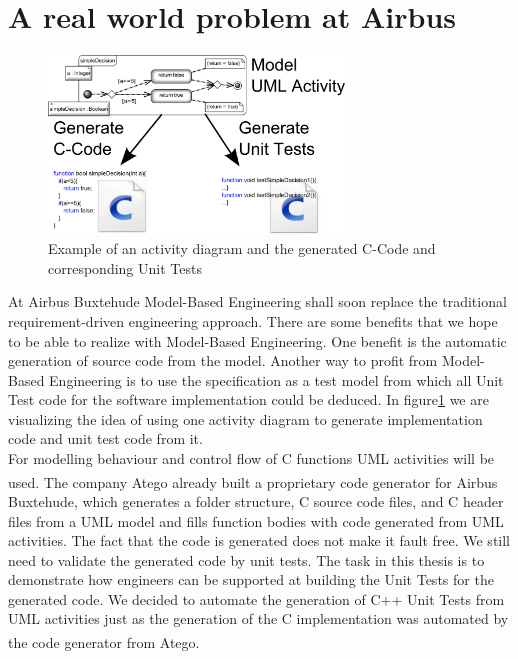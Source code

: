 \section{A real world problem at Airbus}
\begin{figure}
\label{fig:Act2Code+Tests}
\includegraphics[width=0.7\textwidth]{./pics/Activity2Code+Tests.png}
\caption{Example of an activity diagram and the generated C-Code and corresponding Unit Tests}
\end{figure}
At Airbus Buxtehude Model-Based Engineering shall soon replace the traditional requirement-driven engineering approach. There are some benefits that we hope to be able to realize with Model-Based Engineering. One benefit is the automatic generation of source code from the model. Another way to profit from Model-Based Engineering is to use the specification as a test model from which all Unit Test code for the software implementation could be deduced. In figure\ref{fig:Act2Code+Tests} we are visualizing the idea of using one activity diagram to generate implementation code and unit test code from it.\\
For modelling behaviour and control flow of C functions UML activities will be used. The company Atego\textsuperscript{\textregistered} already built a proprietary code generator for Airbus Buxtehude, which generates a folder structure, C source code files, and C header files from a UML model and fills function bodies with code generated from UML activities. The fact that the code is generated does not make it fault free. We still need to validate the generated code by unit tests. The task in this thesis is to demonstrate how engineers can be supported at building the Unit Tests for the generated code. We decided to automate the generation of C++ Unit Tests from UML activities just as the generation of the C implementation was automated by the code generator from Atego\textsuperscript{\textregistered}.\\
